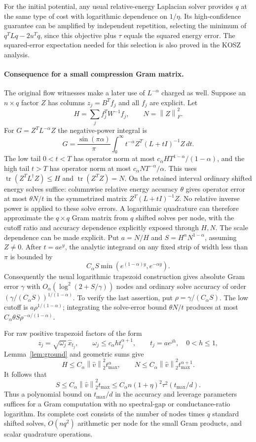 \documentclass[11pt]{article}
\newcommand{\norm}[1]{\left\lVert #1\right\rVert}
\newcommand{\tr}{\operatorname{tr}}
\begin{document}
For the initial potential, any usual relative-energy Laplacian solver
provides $q$ at the same type of cost with logarithmic dependence on
$1/\eta$. Its high-confidence guarantee can be amplified by independent
repetition, selecting the minimum of
$q^TLq-2u^Tq$, since this objective plus $\tau$ equals the squared
energy error. The squared-error expectation needed for this selection
is also proved in the KOSZ analysis.

\paragraph{Consequence for a small compression Gram matrix.}
The original flow witnesses make a later use of $L^{-\alpha}$ charged
as well. Suppose an $n\times q$ factor $Z$ has columns
$z_j=B^Tf_j$ and all $f_j$ are explicit. Let
\[
 H=\sum_j f_j^TW^{-1}f_j,\qquad N=\norm Z_F^2.
\]
For $G=Z^TL^{-\alpha}Z$ the negative-power integral is
\[
 G=\frac{\sin(\pi\alpha)}\pi\int_0^\infty
       t^{-\alpha}Z^T(L+tI)^{-1}Z\,dt.
\]
The low tail $0<t<T$ has operator norm at most
$c_\alpha H T^{1-\alpha}/(1-\alpha)$, and the high tail $t>T$
has operator norm at most $c_\alpha N T^{-\alpha}/\alpha$.
This uses $\tr(Z^TL^\dagger Z)\le H$ and
$\tr(Z^TZ)=N$. On the retained interval ordinary shifted
energy solves suffice: columnwise relative energy accuracy $\theta$
gives operator error at most $\theta N/t$ in the symmetrized matrix
$Z^T(L+tI)^{-1}Z$. No relative inverse power is applied to these
solve errors. A logarithmic quadrature can therefore approximate the
$q\times q$ Gram matrix from $q$ shifted solves per node, with the
cutoff ratio and accuracy dependence explicitly exposed through $H,N$.
The scale dependence can be made explicit. Put $a=N/H$ and
$S=H^\alpha N^{1-\alpha}$, assuming $Z\ne0$. After $t=ae^y$, the
analytic integrand on any fixed strip of width less than $\pi$ is bounded
by
\[
 C_\alpha S\min(e^{(1-\alpha)y},e^{-\alpha y}).
\]
Consequently the usual logarithmic trapezoid construction gives absolute
Gram error $\gamma$ with
$O_\alpha(\log^2(2+S/\gamma))$ nodes and ordinary solve accuracy
of order $(\gamma/(C_\alpha S))^{1/(1-\alpha)}$.
To verify the last assertion, put $\rho=\gamma/(C_\alpha S)$.
The low cutoff is $a\rho^{1/(1-\alpha)}$; integrating the solve-error
bound $\theta N/t$ produces at most
$C_\alpha\theta S\rho^{-\alpha/(1-\alpha)}$.

For raw positive trapezoid factors of the form
\[
 z_j=\sqrt{\omega_j}\,\widehat x_{t_j},\qquad
 \omega_j\le c_\alpha h t_j^{\alpha+1},\qquad
 t_j=ae^{jh},\quad0<h\le1,
\]
Lemma~\ref{lem:ground} and geometric sums give
\[
 H\le C_\alpha\norm{\widehat v}_2^2t_{\max}^{\alpha},\qquad
 N\le C_\alpha\norm{\widehat v}_2^2t_{\max}^{\alpha+1}.
\]
It follows that
\[
 S\le C_\alpha\norm{\widehat v}_2^2t_{\max}
 \le C_\alpha n(1+\eta)^2\tau^2(t_{\max}/d).
\]
Thus a polynomial bound on $t_{\max}/d$ in the accuracy and leverage
parameters suffices for a Gram computation with no spectral-gap or
conductance-ratio logarithm. Its complete cost consists of the number
of nodes times $q$ standard shifted solves, $O(nq^2)$ arithmetic per
node for the small Gram products, and scalar quadrature operations.
\end{document}
